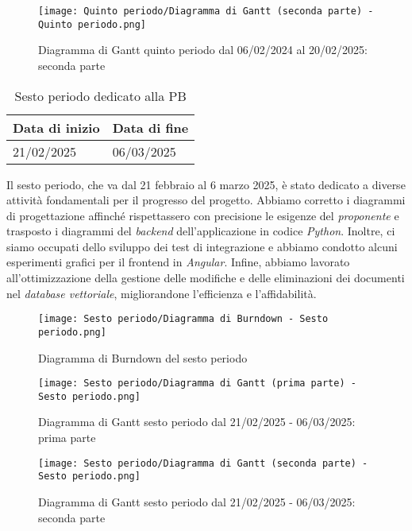 \begin{figure}[h] 
    \centering
    \texttt{[image: Quinto periodo/Diagramma di Gantt (seconda parte) - Quinto periodo.png]}
    \caption{Diagramma di Gantt quinto periodo dal 06/02/2024 al 20/02/2025: seconda parte} 
    \label{fig: Diagramma di Gantt quinto periodo dal 06/02/2024 al 20/02/2025: seconda parte}
\end{figure}

\newpage

\label{sec:sesto periodo}
\begin{table}[h!]
    \centering
    \renewcommand{\arraystretch}{1.5} %
    \begin{tabularx}{\textwidth}{|X|X|}\hline
    \rowcolor[HTML]{FFD700} 
    \textbf{Data di inizio} & \textbf{Data di fine} \\ \hline
    21/02/2025 & 06/03/2025 \\ \hline
    \end{tabularx}
    \caption{Sesto periodo dedicato alla PB}
\end{table}
Il sesto periodo, che va dal 21 febbraio al 6 marzo 2025, è stato dedicato a diverse attività fondamentali per il progresso del progetto. 
Abbiamo corretto i diagrammi di progettazione affinché rispettassero con precisione le esigenze del \emph{proponente} e trasposto i diagrammi del \emph{backend} dell'applicazione in codice \emph{Python}. Inoltre, ci siamo occupati dello sviluppo dei test di integrazione e abbiamo condotto alcuni esperimenti grafici per il frontend in \emph{Angular}. Infine, abbiamo lavorato all'ottimizzazione della gestione delle modifiche e delle eliminazioni dei documenti nel \emph{database vettoriale}, migliorandone l'efficienza e l'affidabilità.

\newpage
\begin{figure}[h] 
    \centering
    \texttt{[image: Sesto periodo/Diagramma di Burndown - Sesto periodo.png]}
    \caption{Diagramma di Burndown del sesto periodo} 
    \label{fig: Diagramma di Burndown del sesto periodo}
\end{figure}
\newpage
\begin{figure}[h] 
    \centering
    \texttt{[image: Sesto periodo/Diagramma di Gantt (prima parte) - Sesto periodo.png]}
    \caption{Diagramma di Gantt sesto periodo dal 21/02/2025 - 06/03/2025: prima parte} 
    \label{fig: Diagramma di Gantt sesto periodo dal 21/02/2025 - 06/03/2025: prima parte}
\end{figure}
\newpage


\begin{figure}[h] 
    \centering
    \texttt{[image: Sesto periodo/Diagramma di Gantt (seconda parte) - Sesto periodo.png]}
    \caption{Diagramma di Gantt sesto periodo dal 21/02/2025 - 06/03/2025: seconda parte} 
    \label{fig: Diagramma di Gantt sesto periodo dal 21/02/2025 - 06/03/2025: seconda parte}
\end{figure}

\newpage